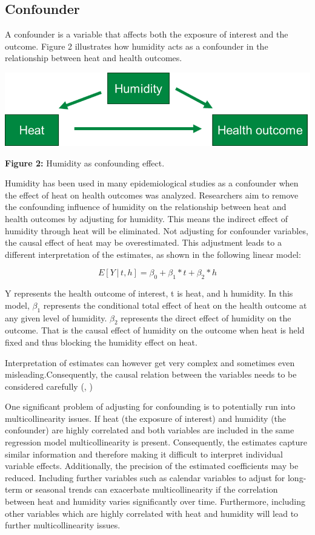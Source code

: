 \documentclass[
]{krantz}
\begin{document}
\subsection{Confounder}\label{confounder}

A confounder is a variable that affects both the exposure of interest and the outcome. Figure 2 illustrates how humidity acts as a confounder in the relationship between heat and health outcomes.

\begin{center}\includegraphics[width=0.8\linewidth]{Confounder} \end{center}

\textbf{Figure 2:} Humidity as confounding effect.

Humidity has been used in many epidemiological studies as a confounder when the effect of heat on health outcomes was analyzed. Researchers aim to remove the confounding influence of humidity on the relationship between heat and health outcomes by adjusting for humidity. This means the indirect effect of humidity through heat will be eliminated. Not adjusting for confounder variables, the causal effect of heat may be overestimated. This adjustment leads to a different interpretation of the estimates, as shown in the following linear model:

\[
Ε[Y│t,h]= β_0+ β_1*t+ β_2*h
\]

Y represents the health outcome of interest, t is heat, and h humidity. In this model, \(β_1\) represents the conditional total effect of heat on the health outcome at any given level of humidity. \(β_2\) represents the direct effect of humidity on the outcome. That is the causal effect of humidity on the outcome when heat is held fixed and thus blocking the humidity effect on heat.

Interpretation of estimates can however get very complex and sometimes even misleading.Consequently, the causal relation between the variables needs to be considered carefully (\citet{bald}, \citet{westreich})

One significant problem of adjusting for confounding is to potentially run into multicollinearity issues.
If heat (the exposure of interest) and humidity (the confounder) are highly correlated and both variables are included in the same regression model multicollinearity is present. Consequently, the estimates capture similar information and therefore making it difficult to interpret individual variable effects. Additionally, the precision of the estimated coefficients may be reduced. Including further variables such as calendar variables to adjust for long-term or seasonal trends can exacerbate multicollinearity if the correlation between heat and humidity varies significantly over time. Furthermore, including other variables which are highly correlated with heat and humidity will lead to further multicollinearity issues.
\end{document}

